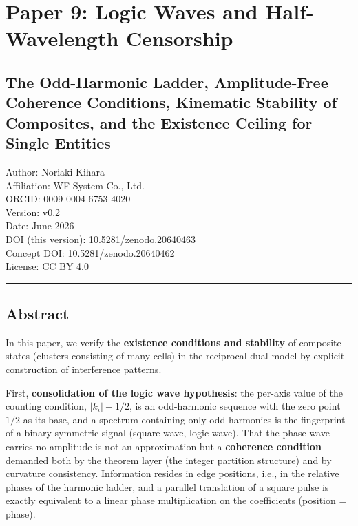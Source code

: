 \documentclass[
]{article}
\author{}
\date{}
\begin{document}
\section{Paper 9: Logic Waves and Half-Wavelength
Censorship}\label{paper-9-logic-waves-and-half-wavelength-censorship}

\subsection{The Odd-Harmonic Ladder, Amplitude-Free Coherence
Conditions, Kinematic Stability of Composites, and the Existence Ceiling
for Single
Entities}\label{the-odd-harmonic-ladder-amplitude-free-coherence-conditions-kinematic-stability-of-composites-and-the-existence-ceiling-for-single-entities}

Author: Noriaki Kihara\\
Affiliation: WF System Co., Ltd.\\
ORCID: 0009-0004-6753-4020\\
Version: v0.2\\
Date: June 2026\\
DOI (this version): 10.5281/zenodo.20640463\\
Concept DOI: 10.5281/zenodo.20640462\\
License: CC BY 4.0

\begin{center}\rule{0.5\linewidth}{0.5pt}\end{center}

\subsection{Abstract}\label{abstract}

In this paper, we verify the \textbf{existence conditions and stability}
of composite states (clusters consisting of many cells) in the
reciprocal dual model by explicit construction of interference patterns.

First, \textbf{consolidation of the logic wave hypothesis}: the per-axis
value of the counting condition, \(|k_i|+1/2\), is an odd-harmonic
sequence with the zero point \(1/2\) as its base, and a spectrum
containing only odd harmonics is the fingerprint of a binary symmetric
signal (square wave, logic wave). That the phase wave carries no
amplitude is not an approximation but a \textbf{coherence condition}
demanded both by the theorem layer (the integer partition structure) and
by curvature consistency. Information resides in edge positions, i.e.,
in the relative phases of the harmonic ladder, and a parallel
translation of a square pulse is exactly equivalent to a linear phase
multiplication on the coefficients (position = phase).
\end{document}
